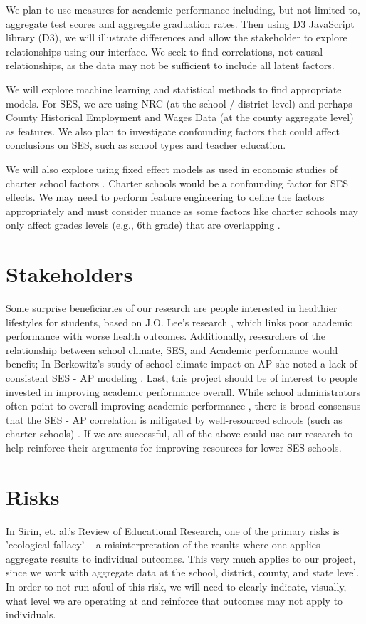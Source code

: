\documentclass[sigconf,nonacm,11pt]{acmart}
\begin{document}
We plan to use measures for academic performance including, but not limited to, aggregate test scores and aggregate graduation rates.  Then using D3 JavaScript library (D3), we will illustrate differences and allow the stakeholder to explore relationships using our interface. We seek to find correlations, not causal relationships, as the data may not be sufficient to include all latent factors.


We will explore machine learning and statistical methods to find appropriate models.  For SES, we are using NRC (at the school / district level) and perhaps County Historical Employment and Wages Data (at the county aggregate level) as features. We also plan to investigate confounding factors that could affect conclusions on SES, such as school types and teacher education.



We will also explore using fixed effect models as used in economic studies of charter school factors \cite{winters, jinnai}. Charter schools would be a confounding factor for SES effects. We may need to perform feature engineering to define the factors appropriately and must consider nuance as some factors like charter schools may only affect grades levels (e.g., 6th grade) that are overlapping \cite{jinnai}.

\section{Stakeholders}
Some surprise beneficiaries of our research are people interested in healthier lifestyles for students, based on J.O. Lee's research \cite{lee}, which links poor academic performance with worse health outcomes. Additionally, researchers of the relationship between school climate, SES, and Academic performance would benefit; In Berkowitz's study of school climate impact on AP she noted a lack of consistent SES - AP modeling \cite{berkowitz}. Last, this project should be of interest to people invested in improving academic performance overall. While school administrators often point to overall improving academic performance \cite{domanico}, there is broad consensus that the SES - AP correlation is mitigated by well-resourced schools (such as charter schools) \cite{domanico, jinnai}. If we are successful, all of the above could use our research to help reinforce their arguments for improving resources for lower SES schools.

\section{Risks}
In Sirin, et. al.'s Review of Educational Research, one of the primary risks is 'ecological fallacy' \cite{sirin} -- a misinterpretation of the results where one applies aggregate results to individual outcomes.  This very much applies to our project, since we work with aggregate data at the school, district, county, and state level.  In order to not run afoul of this risk, we will need to clearly indicate, visually, what level we are operating at and reinforce that outcomes may not apply to individuals.
\end{document}
